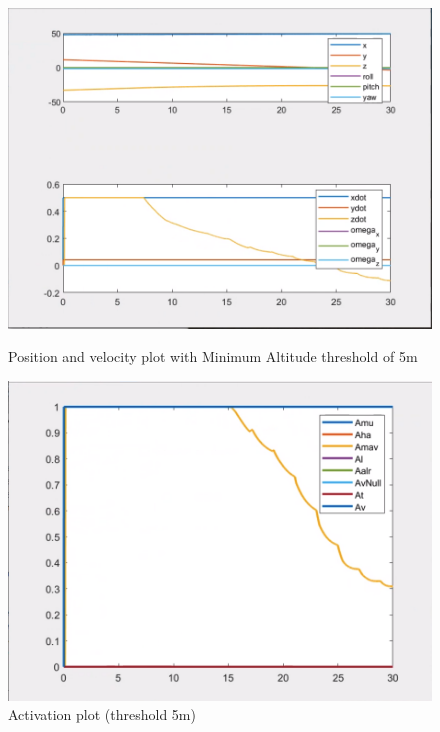 \documentclass{article}
\begin{document}
\begin{figure}[htpb] 
\begin{minipage}{0.40\textwidth}  
\includegraphics[width=\textwidth]{123_5m_ppdot.png}
\caption{Position and velocity plot with Minimum Altitude threshold of 5m}\label{5m_ppdot} 
\end{minipage}  
\hspace{0.2\textwidth} 
\begin{minipage}{0.43\textwidth}  
\includegraphics[width=\textwidth]{123_5m_A.png}
\caption{Activation plot (threshold 5m) }\label{5m_A} 
\end{minipage} 
\end{figure}
\end{document}
